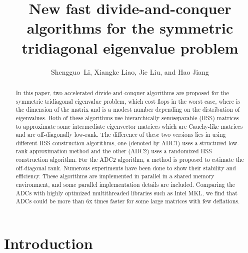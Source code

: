 \documentclass[times]{nlaauth}
\newcounter{algorithm}
\begin{document}

\title{New fast divide-and-conquer algorithms for the symmetric tridiagonal eigenvalue problem}


\author{Shengguo~Li\corrauth, Xiangke Liao, Jie Liu, and Hao Jiang}

\address{College of Computer Science, National University of Defense
  Technology, Changsha 410073, China}


\begin{abstract}
  In this paper, two accelerated divide-and-conquer algorithms are proposed for
  the symmetric tridiagonal eigenvalue problem, which cost  {flops}
  in the worst case, where  is the dimension of the matrix and  is a modest number depending
  on the distribution of eigenvalues.
  Both of these algorithms use hierarchically semiseparable (HSS) matrices to approximate some
  intermediate eigenvector matrices which are Cauchy-like matrices and are off-diagonally low-rank.
  The difference of these two versions lies in using different HSS construction algorithms,
  one (denoted by {ADC1}) uses a structured low-rank approximation method
  and the other ({ADC2}) uses a randomized HSS construction algorithm.
  For the ADC2 algorithm, a method is proposed to estimate the off-diagonal rank.
  Numerous experiments have been done to show their stability and efficiency.
  These algorithms are implemented in parallel in a shared memory environment, and
  some parallel implementation details are included. Comparing the ADCs with
  highly optimized multithreaded libraries such as Intel MKL, we find that ADCs could be more than 6x times faster
  for some large matrices with few deflations.
\end{abstract}


\maketitle



\vspace{-6pt}

\section{Introduction}
\vspace{-2pt}
\end{document}
